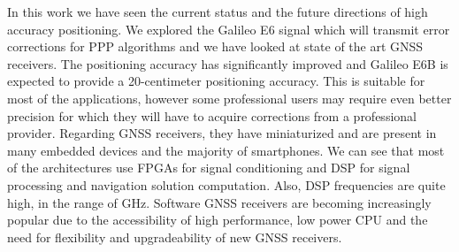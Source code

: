In this work we have seen the current status and the future directions of high accuracy positioning. We explored the Galileo E6 signal which will transmit error corrections for PPP algorithms and we have looked at state of the art GNSS receivers. The positioning accuracy has significantly improved and Galileo E6B is expected to provide a 20-centimeter positioning accuracy. This is suitable for most of the applications, however some professional users may require even better precision for which they will have to acquire corrections from a professional provider.
Regarding GNSS receivers, they have miniaturized and are present in many embedded devices and the majority of smartphones. We can see that most of the architectures use FPGAs for signal conditioning and DSP for signal processing and navigation solution computation. Also, DSP frequencies are quite high, in the range of GHz. Software GNSS receivers are becoming increasingly popular due to the accessibility of high performance, low power CPU and the need for flexibility and upgradeability of new GNSS receivers.